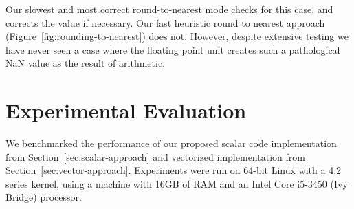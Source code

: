 \documentclass{sig-alternate-05-2015}
\begin{document}
Our slowest and most correct round-to-nearest mode checks for this case, and
corrects the value if necessary. Our fast heuristic round to nearest approach
(Figure~\ref{fig:rounding-to-nearest}) does not. However, despite extensive
testing we have never seen a case where the floating point unit creates such a
pathological NaN value as the result of arithmetic.















































































\section{Experimental Evaluation}
\label{sec:eval}

We benchmarked the performance of our proposed scalar code implementation from
Section~\ref{sec:scalar-approach} and vectorized implementation from
Section~\ref{sec:vector-approach}. Experiments were run on 64-bit Linux with a
4.2 series kernel, using a machine with 16GB of RAM and an Intel Core i5-3450
(Ivy Bridge) processor.
\end{document}
